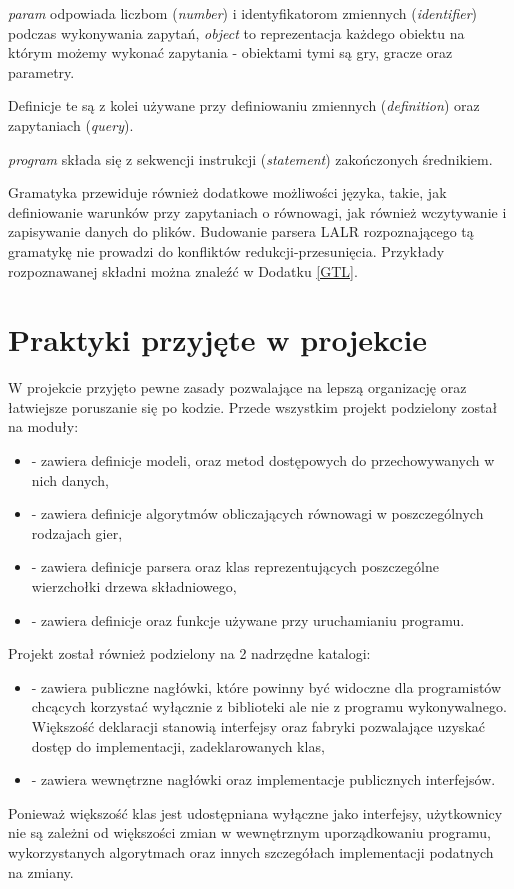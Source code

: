 \documentclass[polish]{standalone}
\begin{document}
\textit{param} odpowiada liczbom (\textit{number}) i identyfikatorom zmiennych (\textit{identifier}) podczas wykonywania
zapytań, \textit{object} to reprezentacja każdego obiektu na którym możemy wykonać zapytania - obiektami tymi są gry,
gracze oraz parametry.

Definicje te są z kolei używane przy definiowaniu zmiennych (\textit{definition}) oraz zapytaniach (\textit{query}).

\textit{program} składa się z sekwencji instrukcji (\textit{statement}) zakończonych średnikiem.

Gramatyka przewiduje również dodatkowe możliwości języka, takie, jak definiowanie warunków przy zapytaniach o równowagi,
jak również wczytywanie i zapisywanie danych do plików. Budowanie parsera LALR rozpoznającego tą gramatykę nie prowadzi
do konfliktów redukcji-przesunięcia. Przykłady rozpoznawanej składni można znaleźć w Dodatku \ref{GTL}.

\section{Praktyki przyjęte w projekcie}

W projekcie przyjęto pewne zasady pozwalające na lepszą organizację oraz łatwiejsze poruszanie się po kodzie. Przede
wszystkim projekt podzielony został na moduły:
\begin{itemize}
\item {} - zawiera definicje modeli, oraz metod dostępowych do przechowywanych w nich danych,
\item {} - zawiera definicje algorytmów obliczających równowagi w poszczególnych rodzajach gier,
\item {} - zawiera definicje parsera oraz klas reprezentujących poszczególne wierzchołki drzewa składniowego,
\item {} - zawiera definicje oraz funkcje używane przy uruchamianiu programu.
\end{itemize}

Projekt został również podzielony na 2 nadrzędne katalogi:
\begin{itemize}
\item {} - zawiera publiczne nagłówki, które powinny być widoczne dla programistów chcących korzystać
wyłącznie z biblioteki ale nie z programu wykonywalnego. Większość deklaracji stanowią interfejsy oraz fabryki
pozwalające uzyskać dostęp do implementacji, zadeklarowanych klas,
\item {} - zawiera wewnętrzne nagłówki oraz implementacje publicznych interfejsów.
\end{itemize}
Ponieważ większość klas jest udostępniana wyłączne jako interfejsy, użytkownicy nie są zależni od większości zmian
w wewnętrznym uporządkowaniu programu, wykorzystanych algorytmach oraz innych szczegółach implementacji podatnych
na zmiany.
\end{document}
